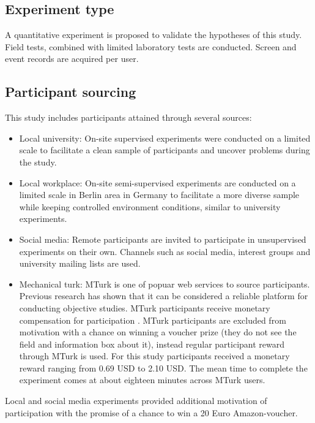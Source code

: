 \subsection{Experiment type} A quantitative experiment is proposed to validate the hypotheses of this study. Field tests, combined with limited laboratory tests are conducted. Screen and event records are acquired per user.

\subsection{Participant sourcing}  \label{sec:participant-sourcing}
This study includes participants attained through several sources:
\begin{itemize}
	\item{Local university:} On-site supervised experiments were conducted on a limited scale to facilitate a clean sample of participants and uncover problems during the study.
	
	\item{Local workplace:} On-site semi-supervised experiments are conducted on a limited scale in Berlin area in Germany to facilitate a more diverse sample while keeping controlled environment conditions, similar to university experiments.
	
	\item{Social media:} Remote participants are invited to participate in unsupervised experiments on their own. Channels such as social media, interest groups and university mailing lists are used.
	
	\item{Mechanical turk:} MTurk is one of popuar web services to source participants. Previous research has shown that it can be considered a reliable platform for conducting objective studies. MTurk participants receive monetary compensation for participation \cite{Buhrmester2011a}. MTurk participants are excluded from motivation with a chance on winning a voucher prize (they do not see the field and information box about it), instead regular participant reward through MTurk is used. For this study participants received a monetary reward ranging from 0.69 USD to 2.10 USD. The mean time to complete the experiment comes at about eighteen minutes across MTurk users.
	
\end{itemize}

Local and social media experiments provided additional motivation of participation with the promise of a chance to win a 20 Euro Amazon-voucher.